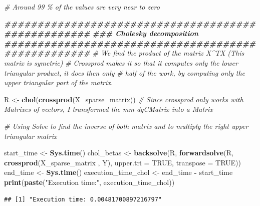 \documentclass[
]{article}
\newenvironment{Shaded}{\begin{snugshade}}{\end{snugshade}}
\newcommand{\AttributeTok}[1]{\textcolor[rgb]{0.13,0.29,0.53}{#1}}
\newcommand{\CommentTok}[1]{\textcolor[rgb]{0.56,0.35,0.01}{\textit{#1}}}
\newcommand{\ConstantTok}[1]{\textcolor[rgb]{0.56,0.35,0.01}{#1}}
\newcommand{\DocumentationTok}[1]{\textcolor[rgb]{0.56,0.35,0.01}{\textbf{\textit{#1}}}}
\newcommand{\FunctionTok}[1]{\textcolor[rgb]{0.13,0.29,0.53}{\textbf{#1}}}
\newcommand{\NormalTok}[1]{#1}
\newcommand{\OtherTok}[1]{\textcolor[rgb]{0.56,0.35,0.01}{#1}}
\newcommand{\SpecialCharTok}[1]{\textcolor[rgb]{0.81,0.36,0.00}{\textbf{#1}}}
\newcommand{\StringTok}[1]{\textcolor[rgb]{0.31,0.60,0.02}{#1}}
\begin{document}
\begin{Shaded}
\begin{Highlighting}[]
\CommentTok{\# Around 99 \% of the values are very near to zero}


\DocumentationTok{\#\#\#\#\#\#\#\#\#\#\#\#\#\#\#\#\#\#\#\#\#\#\#\#\#\#\#\#\#\#\#\#\#\#\#\#\#\#\#\#\#\#\#\#\#\#\#\#\#\#\#}
\DocumentationTok{\#\#\# Cholesky decomposition}
\DocumentationTok{\#\#\#\#\#\#\#\#\#\#\#\#\#\#\#\#\#\#\#\#\#\#\#\#\#\#\#\#\#\#\#\#\#\#\#\#\#\#\#\#\#\#\#\#\#\#\#\#\#\#\#}
\CommentTok{\# We find the product of the matrix X\^{}TX (This matrix is symetric)}
\CommentTok{\# Crossprod makes it so that it computes only the lower triangular product, it does then only }
\CommentTok{\# half of the work, by computing only the upper triangular part of the matrix.}


\NormalTok{R }\OtherTok{\textless{}{-}} \FunctionTok{chol}\NormalTok{(}\FunctionTok{crossprod}\NormalTok{(X\_sparse\_matrix))}
\CommentTok{\# Since crossprod only works with Matrixes of vectors, I transformed the mm dgCMatrix into a Matrix}

\CommentTok{\# Using Solve to find the inverse of both matrix and to multiply the right upper triangular matrix}

\NormalTok{start\_time }\OtherTok{\textless{}{-}} \FunctionTok{Sys.time}\NormalTok{()}
\NormalTok{chol\_betas }\OtherTok{\textless{}{-}} \FunctionTok{backsolve}\NormalTok{(R, }\FunctionTok{forwardsolve}\NormalTok{(R, }\FunctionTok{crossprod}\NormalTok{(X\_sparse\_matrix , Y), }\AttributeTok{upper.tri =} \ConstantTok{TRUE}\NormalTok{, }\AttributeTok{transpose =} \ConstantTok{TRUE}\NormalTok{))}
\NormalTok{end\_time }\OtherTok{\textless{}{-}} \FunctionTok{Sys.time}\NormalTok{()}
\NormalTok{execution\_time\_chol }\OtherTok{\textless{}{-}}\NormalTok{ end\_time }\SpecialCharTok{{-}}\NormalTok{ start\_time}
\FunctionTok{print}\NormalTok{(}\FunctionTok{paste}\NormalTok{(}\StringTok{"Execution time:"}\NormalTok{, execution\_time\_chol))}
\end{Highlighting}
\end{Shaded}

\begin{verbatim}
## [1] "Execution time: 0.00481700897216797"
\end{verbatim}
\end{document}
